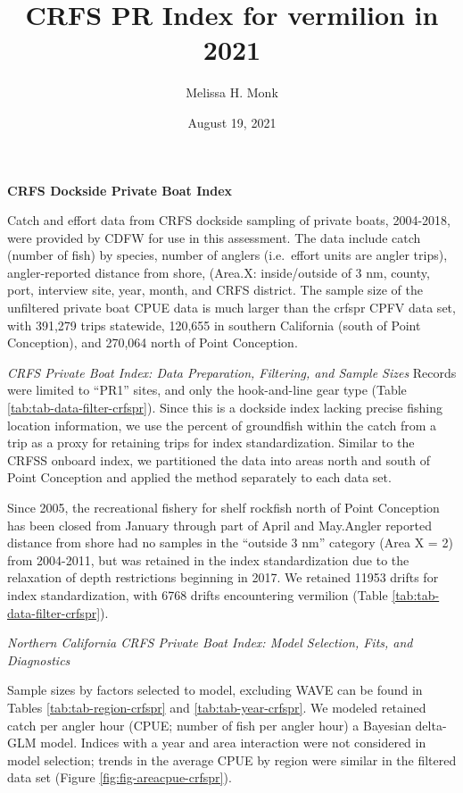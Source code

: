 \documentclass[
]{article}
\title{CRFS PR Index for vermilion in 2021}
\author{Melissa H. Monk}
\date{August 19, 2021}
\begin{document}
\maketitle

{
\setcounter{tocdepth}{2}
\tableofcontents
}
\textbf{CRFS Dockside Private Boat Index}

Catch and effort data from CRFS dockside sampling of private boats, 2004-2018,
were provided by CDFW for use in this assessment. The data include catch (number
of fish) by species, number of anglers (i.e.~effort units are angler trips),
angler-reported distance from shore, (Area.X: inside/outside of 3 nm, county, port,
interview site, year, month, and CRFS district. The sample size of the
unfiltered private boat CPUE data is much larger than the crfspr CPFV data set,
with 391,279 trips statewide, 120,655 in southern California (south
of Point Conception), and 270,064 north of Point Conception.

\emph{CRFS Private Boat Index: Data Preparation, Filtering, and Sample Sizes}
Records were limited to ``PR1'' sites, and only the hook-and-line gear type
(Table \ref{tab:tab-data-filter-crfspr}).
Since this is a dockside index lacking precise fishing location information, we
use the percent of groundfish within the catch from a trip as a proxy for retaining
trips for index standardization. Similar to the CRFSS onboard index, we partitioned the
data into areas north and south of Point Conception and applied the method
separately to each data set.

Since 2005, the recreational fishery for shelf rockfish north of Point Conception
has been closed from January through part of April and May.Angler reported distance
from shore had no samples in the ``outside 3 nm'' category (Area X = 2)
from 2004-2011, but was retained in the index standardization due to the relaxation
of depth restrictions beginning in 2017. We retained 11953 drifts for
index standardization, with 6768 drifts encountering vermilion
(Table \ref{tab:tab-data-filter-crfspr}).

\emph{Northern California CRFS Private Boat Index: Model Selection, Fits, and Diagnostics}

Sample sizes by factors selected to model, excluding WAVE can be found in Tables
\ref{tab:tab-region-crfspr} and \ref{tab:tab-year-crfspr}.
We modeled retained catch per angler hour (CPUE; number of fish per angler hour)
a Bayesian delta-GLM model. Indices with a year and area interaction were not
considered in model selection; trends in the average CPUE by region were similar
in the filtered data set (Figure \ref{fig:fig-areacpue-crfspr}).
\end{document}
